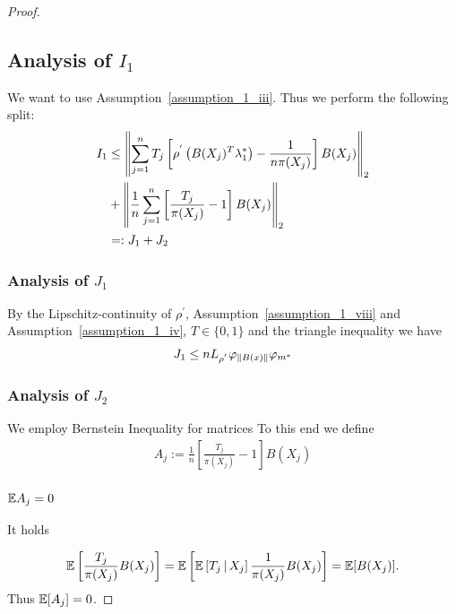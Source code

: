 \begin{proof}
\subsection*{Analysis of $I_1$}
We want to use Assumption~\ref{assumption_1_iii}.
Thus we perform the following split:
\begin{align}
  I_1 
  &\le
    \left\lVert
      \sum_{j = 1}^{n} 
        T_j  
      \left[ 
        \rho^{'} 
        \left( 
          B(X_j)^T \lambda^*_1
        \right)
      -
      \frac{1}{n \pi(X_j)}
      \right]
      B(X_j)
    \right\rVert_2
  \\
  &+
    \left\lVert
      \frac{1}{n}
      \sum_{j = 1}^{n} 
      \left[ 
        \frac{T_j}{\pi(X_j)}
      -
      1
      \right]
      B(X_j)
    \right\rVert_2
    \\
  &=:
  J_1 + J_2
\end{align}

\subsubsection*{Analysis of $J_1$}

By the Lipschitz-continuity of 
$\rho^{'}$,
Assumption~\ref{assumption_1_viii}
and
Assumption~\ref{assumption_1_iv},
$T \in \{0, 1\}$
and 
the triangle inequality 
we have
\begin{gather}
  J_1 
  \le
  n L_{\rho^{'}}\varphi_{\left\lVert B(x)\right\rVert} \varphi_{m^*}
\end{gather}

\subsubsection*{Analysis of $J_2$}
We employ Bernstein Inequality for matrices
To this end we define
\begin{gather}
  A_j
  :=
      \frac{1}{n}
      \left[ 
        \frac{T_j}{\pi(X_j)}
      -
      1
      \right]
      B(X_j)
\end{gather}

\subsubsection*{$\mathbb{E} A_j = 0$}

It holds

\begin{gather}
  \mathbb{E}
  \left[  
    \frac{T_j}{\pi(X_j)}
    B(X_j)
  \right]
  =
  \mathbb{E}
  \left[  
    \mathbb{E}
    \left[  
      T_j
      \, | \,
      X_j
    \right]
    \frac{1}{\pi(X_j)}
    B(X_j)
  \right]
  =
  \mathbb{E}[B(X_j)]. 
\end{gather}
Thus 
$\mathbb{E}[A_j] = 0$.

\end{proof}
